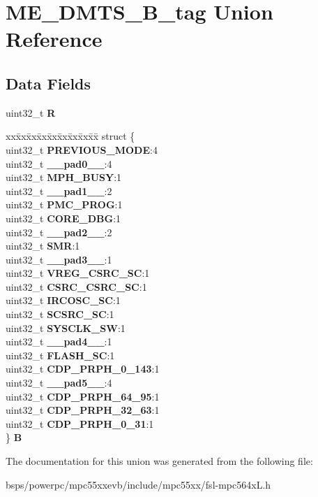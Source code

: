 \hypertarget{unionME__DMTS__32B__tag}{}\section{M\+E\+\_\+\+D\+M\+T\+S\+\_\+B\+\_\+tag Union Reference}
\label{unionME__DMTS__32B__tag}
\subsection*{Data Fields}
\begin{DoxyCompactItemize}
\item 
\mbox{\label{unionME__DMTS__32B__tag_a46228e05b40ecd82fef377b97f391758}} 
uint32\+\_\+t {\bfseries R}
\item 
\mbox{\label{unionME__DMTS__32B__tag_ab2c2798c6d008dbb43445fc291b46e94}} 
\begin{tabbing}
xx\=xx\=xx\=xx\=xx\=xx\=xx\=xx\=xx\=\kill
struct \{\\
\>uint32\_t {\bfseries PREVIOUS\_MODE}:4\\
\>uint32\_t {\bfseries \_\_pad0\_\_}:4\\
\>uint32\_t {\bfseries MPH\_BUSY}:1\\
\>uint32\_t {\bfseries \_\_pad1\_\_}:2\\
\>uint32\_t {\bfseries PMC\_PROG}:1\\
\>uint32\_t {\bfseries CORE\_DBG}:1\\
\>uint32\_t {\bfseries \_\_pad2\_\_}:2\\
\>uint32\_t {\bfseries SMR}:1\\
\>uint32\_t {\bfseries \_\_pad3\_\_}:1\\
\>uint32\_t {\bfseries VREG\_CSRC\_SC}:1\\
\>uint32\_t {\bfseries CSRC\_CSRC\_SC}:1\\
\>uint32\_t {\bfseries IRCOSC\_SC}:1\\
\>uint32\_t {\bfseries SCSRC\_SC}:1\\
\>uint32\_t {\bfseries SYSCLK\_SW}:1\\
\>uint32\_t {\bfseries \_\_pad4\_\_}:1\\
\>uint32\_t {\bfseries FLASH\_SC}:1\\
\>uint32\_t {\bfseries CDP\_PRPH\_0\_143}:1\\
\>uint32\_t {\bfseries \_\_pad5\_\_}:4\\
\>uint32\_t {\bfseries CDP\_PRPH\_64\_95}:1\\
\>uint32\_t {\bfseries CDP\_PRPH\_32\_63}:1\\
\>uint32\_t {\bfseries CDP\_PRPH\_0\_31}:1\\
\} {\bfseries B}\\

\end{tabbing}\end{DoxyCompactItemize}


The documentation for this union was generated from the following file\+:\begin{DoxyCompactItemize}
\item 
bsps/powerpc/mpc55xxevb/include/mpc55xx/fsl-\/mpc564x\+L.\+h\end{DoxyCompactItemize}
